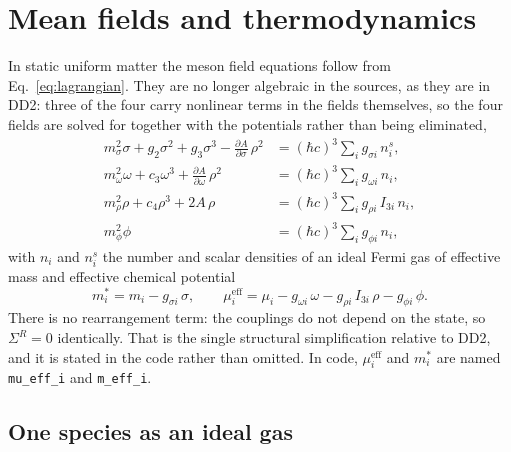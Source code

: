 \documentclass[aps,prc,onecolumn,superscriptaddress,nofootinbib,10pt]{revtex4-2}
\newcommand{\mueff}[1]{\mu^{\mathrm{eff}}_{#1}}
\newcommand{\meff}[1]{m^{*}_{#1}}
\begin{document}
\section{Mean fields and thermodynamics}
\label{sec:fields}

In static uniform matter the meson field equations follow from
Eq.~\eqref{eq:lagrangian}. They are no longer algebraic in the sources, as
they are in DD2: three of the four carry nonlinear terms in the fields
themselves, so the four fields are solved for together with the potentials
rather than being eliminated,
%
\begin{align}
m_\sigma^2 \sigma + g_2 \sigma^2 + g_3 \sigma^3
   - \frac{\partial A}{\partial \sigma}\, \rho^2
   &= (\hbar c)^3 \sum_i g_{\sigma i}\, n^s_i ,
\label{eq:fieldeqs}\\
m_\omega^2 \omega + c_3 \omega^3
   + \frac{\partial A}{\partial \omega}\, \rho^2
   &= (\hbar c)^3 \sum_i g_{\omega i}\, n_i ,
\nonumber\\
m_\rho^2 \rho + c_4 \rho^3 + 2 A\, \rho
   &= (\hbar c)^3 \sum_i g_{\rho i}\, I_{3i}\, n_i ,
\nonumber\\
m_\phi^2 \phi &= (\hbar c)^3 \sum_i g_{\phi i}\, n_i ,
\nonumber
\end{align}
%
with $n_i$ and $n^s_i$ the number and scalar densities of an ideal Fermi gas
of effective mass and effective chemical potential
%
\begin{equation}
\meff{i} = m_i - g_{\sigma i}\, \sigma, \qquad
\mueff{i} = \mu_i - g_{\omega i}\, \omega
          - g_{\rho i}\, I_{3i}\, \rho
          - g_{\phi i}\, \phi .
\label{eq:mueff}
\end{equation}
%
There is no rearrangement term: the couplings do not depend on the state, so
$\Sigma^R = 0$ identically. That is the single structural simplification
relative to DD2, and it is stated in the code rather than omitted. In code, $\mueff{i}$ and $\meff{i}$ are named \texttt{mu\_eff\_i} and
\texttt{m\_eff\_i}.

\subsection{One species as an ideal gas}
\label{sec:kinetic}
\end{document}
